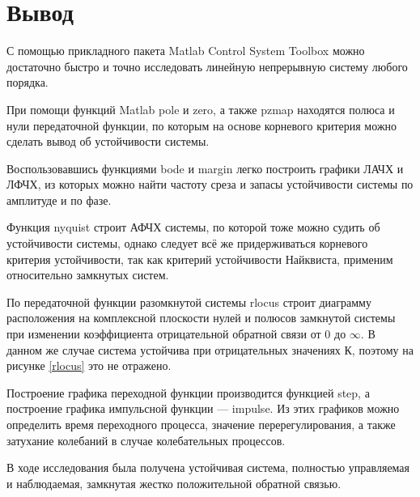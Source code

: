 \documentclass[12pt,a4paper]{article}
\begin{document}
\section*{Вывод}
С помощью прикладного пакета Matlab Control System Toolbox можно достаточно быстро и точно исследовать линейную непрерывную систему любого порядка.\par
При помощи функций Matlab pole и zero, а также pzmap находятся полюса и нули передаточной функции, по которым на основе корневого критерия можно сделать вывод об устойчивости системы.\par
Воспользовавшись функциями bode и margin легко построить графики ЛАЧХ и ЛФЧХ, из которых можно найти частоту среза и запасы устойчивости системы по амплитуде и по фазе.\par
Функция nyquist строит АФЧХ системы, по которой тоже можно судить об устойчивости системы, однако следует всё же придерживаться корневого критерия устойчивости, так как критерий устойчивости Найквиста, применим относительно замкнутых систем.\par
По передаточной функции разомкнутой системы rlocus строит диаграмму расположения на комплексной плоскости нулей и полюсов замкнутой системы при изменении коэффициента отрицательной обратной связи
от 0 до $\infty$. В данном же случае система устойчива при отрицательных значениях К, поэтому на рисунке \ref{rlocus} это не отражено.\par
Построение графика переходной функции производится функцией step, а построение графика импульсной функции --- impulse. Из этих графиков можно определить время переходного процесса, значение перерегулирования, а также затухание колебаний в случае колебательных процессов.\par
В ходе исследования была получена устойчивая система, полностью управляемая и наблюдаемая, замкнутая жестко положительной обратной связью.
\end{document}

